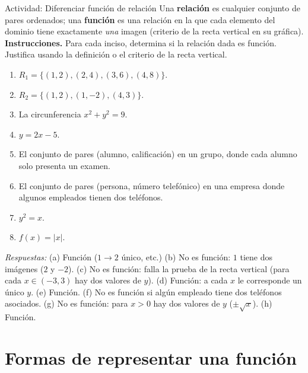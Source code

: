 \documentclass[12pt,letterpaper]{book}
\begin{document}
\begin{actbox}{Actividad: Diferenciar función de relación}
Una \textbf{relación} es cualquier conjunto de pares ordenados; una \textbf{función} es una relación en la que cada elemento del dominio tiene exactamente \emph{una} imagen (criterio de la recta vertical en su gráfica).\\[4pt]
\textbf{Instrucciones.} Para cada inciso, determina si la relación dada es función. Justifica usando la definición o el criterio de la recta vertical.
\begin{enumerate}[label=(\alph*)]
\item $R_1=\{(1,2),(2,4),(3,6),(4,8)\}$.
\item $R_2=\{(1,2),(1,-2),(4,3)\}$.
\item La circunferencia $x^2+y^2=9$.
\item $y=2x-5$.
\item El conjunto de pares (alumno, calificación) en un grupo, donde cada alumno solo presenta un examen.
\item El conjunto de pares (persona, número telefónico) en una empresa donde algunos empleados tienen dos teléfonos.
\item $y^2=x$.
\item $f(x)=|x|$.
\end{enumerate}
\textit{Respuestas:} (a) Función ($1\to2$ único, etc.) (b) No es función: $1$ tiene dos imágenes ($2$ y $-2$). (c) No es función: falla la prueba de la recta vertical (para cada $x\in(-3,3)$ hay dos valores de $y$). (d) Función: a cada $x$ le corresponde un único $y$. (e) Función. (f) No es función si algún empleado tiene dos teléfonos asociados. (g) No es función: para $x>0$ hay dos valores de $y$ ($\pm\sqrt x$). (h) Función.
\end{actbox}

\section{Formas de representar una función}

\begin{center}
\end{center}
\end{document}
